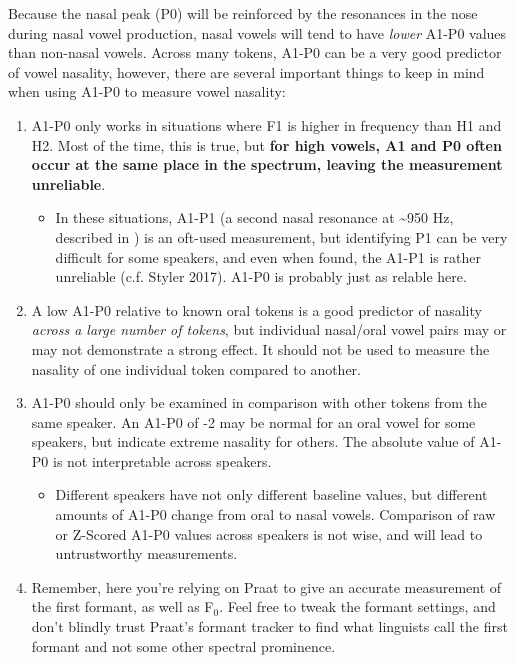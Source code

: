 Because the nasal peak (P0) will be reinforced by the resonances in the
nose during nasal vowel production, nasal vowels will tend to have
\emph{lower} A1-P0 values than non-nasal vowels. Across many tokens,
A1-P0 can be a very good predictor of vowel nasality, however, there are
several important things to keep in mind when using A1-P0 to measure
vowel nasality:

\begin{enumerate}
\def\labelenumi{\arabic{enumi}.}
\tightlist
\item
  A1-P0 only works in situations where F1 is higher in frequency than H1
  and H2. Most of the time, this is true, but \textbf{for high vowels,
  A1 and P0 often occur at the same place in the spectrum, leaving the
  measurement unreliable}.

  \begin{itemize}
  \tightlist
  \item
    In these situations, A1-P1 (a second nasal resonance at
    \textasciitilde950 Hz, described in \cite{Chen:1997vr}) is an
    oft-used measurement, but identifying P1 can be very difficult for
    some speakers, and even when found, the A1-P1 is rather unreliable
    (c.f. Styler 2017). A1-P0 is probably just as relable here.
  \end{itemize}
\item
  A low A1-P0 relative to known oral tokens is a good predictor of
  nasality \emph{across a large number of tokens}, but individual
  nasal/oral vowel pairs may or may not demonstrate a strong effect. It
  should not be used to measure the nasality of one individual token
  compared to another.
\item
  A1-P0 should only be examined in comparison with other tokens from the
  same speaker. An A1-P0 of -2 may be normal for an oral vowel for some
  speakers, but indicate extreme nasality for others. The absolute value
  of A1-P0 is not interpretable across speakers.

  \begin{itemize}
  \tightlist
  \item
    Different speakers have not only different baseline values, but
    different amounts of A1-P0 change from oral to nasal vowels.
    Comparison of raw or Z-Scored A1-P0 values across speakers is not
    wise, and will lead to untrustworthy measurements.
  \end{itemize}
\item
  Remember, here you're relying on Praat to give an accurate measurement
  of the first formant, as well as F$_{0}$. Feel free to tweak the formant
  settings, and don't blindly trust Praat's formant tracker to find what
  linguists call the first formant and not some other spectral
  prominence.
\end{enumerate}

